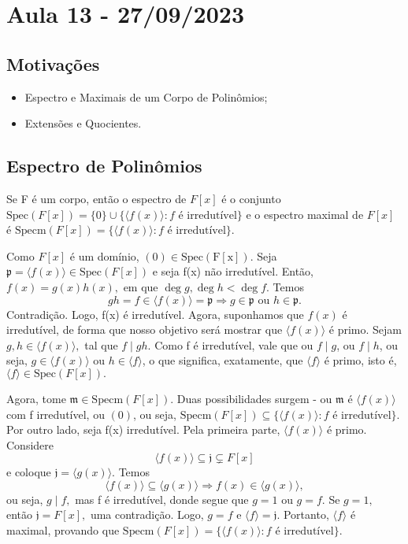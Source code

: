 \documentclass[AlgebraII/algebraII_notes.tex]{subfiles}
\begin{document}
\section{Aula 13 - 27/09/2023}
\subsection{Motivações}
\begin{itemize}
	\item Espectro e Maximais de um Corpo de Polinômios;
	\item Extensões e Quocientes.
\end{itemize}
\subsection{Espectro de Polinômios}
\begin{prop*}
	Se F é um corpo, então o espectro de \(F[x]\) é o conjunto \(\mathrm{Spec}(F[x]) = \{0\}\cup\{\langle f(x) \rangle: f\text{ é irredutível}\}\) e o espectro maximal de
	\(F[x]\) é \(\mathrm{Specm}(F[x]) = \{\langle f(x) \rangle: f\text{ é irredutível}\}\).
\end{prop*}
\begin{proof*}
	Como \(F[x]\) é um domínio, \((0)\in \mathrm{Spec(F[x])}.\) Seja \( \mathfrak{p} = \langle f(x) \rangle\in \mathrm{Spec}(F[x])\) e seja
	f(x) não irredutível. Então, \(f(x) = g(x)h(x),\) em que \(\deg{g}, \deg{h} < \deg{f}.\) Temos
	\[
		gh = f\in \langle f(x) \rangle = \mathfrak{p} \Rightarrow g\in \mathfrak{p}\text{ ou } h\in \mathfrak{p}.
	\]
	Contradição. Logo, f(x) é irredutível. Agora, suponhamos que \(f(x)\) é irredutível, de forma que nosso objetivo será mostrar que
	\(\langle f(x) \rangle\) é primo. Sejam \(g, h \in \langle f(x) \rangle,\) tal que \(f\mid gh.\) Como f é irredutível, vale que
	ou \(f\mid g\), ou \(f\mid h\), ou seja, \(g\in \langle f(x) \rangle\) ou \(h\in \langle f \rangle\), o que significa, exatamente,
	que \(\langle f \rangle\) é primo, isto é, \(\langle f \rangle\in \mathrm{Spec}(F[x]).\)

	Agora, tome \(\mathfrak{m}\in \mathrm{Specm}(F[x]).\) Duas possibilidades surgem - ou \(\mathfrak{m}\) é \(\langle f(x) \rangle\) com f irredutível,
	ou \((0)\), ou seja, \(\mathrm{Specm}(F[x]) \subseteq{\{\langle f(x) \rangle: f\text{ é irredutível}\}}\). Por outro lado,
	seja f(x) irredutível. Pela primeira parte, \(\langle f(x) \rangle\) é primo. Considere
	\[
		\langle f(x) \rangle \subseteq{\mathfrak{j}}\subsetneq{F[x]}
	\]
	e coloque \(\mathfrak{j} = \langle g(x) \rangle.\) Temos
	\[
		\langle f(x) \rangle \subseteq{\langle g(x) \rangle} \Rightarrow f(x)\in \langle g(x) \rangle,
	\]
	ou seja, \(g\mid f,\) mas f é irredutível, donde segue que \(g=1\) ou \(g = f.\) Se \(g=1,\) então \(\mathfrak{j} = F[x],\)
	uma contradição. Logo, \(g=f\) e \(\langle f \rangle = \mathfrak{j}.\) Portanto, \(\langle f \rangle\) é maximal, provando que
	\(\mathrm{Specm}(F[x]) = \{\langle f(x) \rangle: f\text{ é irredutível}\}\). \qedsymbol
\end{proof*}
\end{document}

